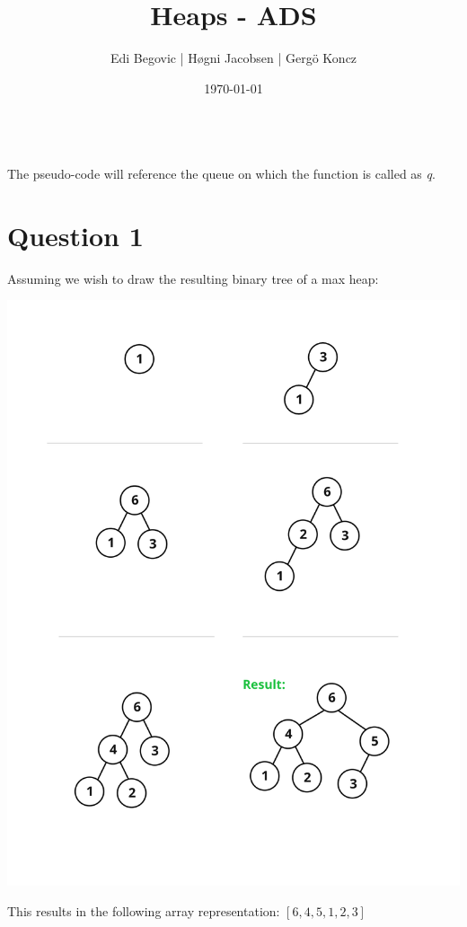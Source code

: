 \documentclass[a4paper]{article}
\title{Heaps - ADS}
\author{Edi Begovic | Høgni Jacobsen | Gergö Koncz}
\date{\today}
\begin{document}
 
\maketitle

\ \\
\noindent
The pseudo-code will reference the queue on which the function is called as \textit{q}.
\ \\
\section*{Question 1}
Assuming we wish to draw the resulting binary tree of a max heap:
\ \\
\begin{center}
\includegraphics[scale=0.16]{figure1.png}
\end{center}

\noindent
This results in the following array representation: 
$[6, 4, 5, 1, 2, 3]$


\ \\
\end{document}
